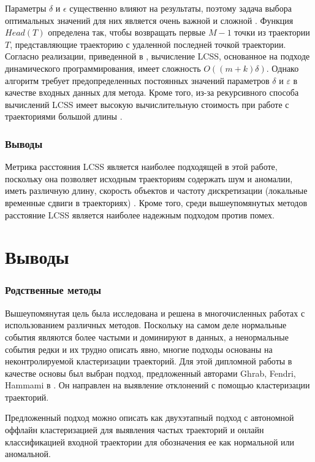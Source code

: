 Параметры $\delta$ и $\epsilon$ существенно влияют на результаты, поэтому задача выбора оптимальных значений для них является очень важной и сложной \cite{inproceedings:7_related_work}\cite{inproceedings:28_lcss_dsmt}. Функция $Head(T)$ определена так, чтобы возвращать первые $M - 1$ точки из траектории $T$, представляющие траекторию с удаленной последней точкой траектории. Согласно реализации, приведенной в \cite{online:r_lcss}, вычисление LCSS, основанное на подходе динамического программирования, имеет сложность $O((m + k)\delta)$. Однако алгоритм требует предопределенных постоянных значений параметров $\delta$ и $\varepsilon$ в качестве входных данных для метода. Кроме того, из-за рекурсивного способа вычислений LCSS имеет высокую вычислительную стоимость при работе с траекториями большой длины \cite{inproceedings:comp_sim_meas_trcl}.

\subsubsection{Выводы}

Метрика расстояния LCSS является наиболее подходящей в этой работе, поскольку она позволяет исходным траекториям содержать шум и аномалии, иметь различную длину, скорость объектов и частоту дискретизации (локальные временные сдвиги в траекториях) \cite{inproceedings:7_related_work}. Кроме того, среди вышеупомянутых методов расстояние LCSS является наиболее надежным подходом против помех.

\section{Выводы}

\subsubsection{Родственные методы}

Вышеупомянутая цель была исследована и решена в многочисленных работах с использованием различных методов. Поскольку на самом деле нормальные события являются более частыми и доминируют в данных, а ненормальные события редки и их трудно описать явно, многие подходы основаны на неконтролируемой кластеризации траекторий. Для этой дипломной работы в качестве основы был выбран подход, предложенный авторами Ghrab, Fendri, Hammami в \cite{inproceedings:7_related_work}. Он направлен на выявление отклонений с помощью кластеризации траекторий.

Предложенный подход можно описать как двухэтапный подход с автономной оффлайн кластеризацией для выявления частых траекторий и онлайн классификацией входной траектории для обозначения ее как нормальной или аномальной.

